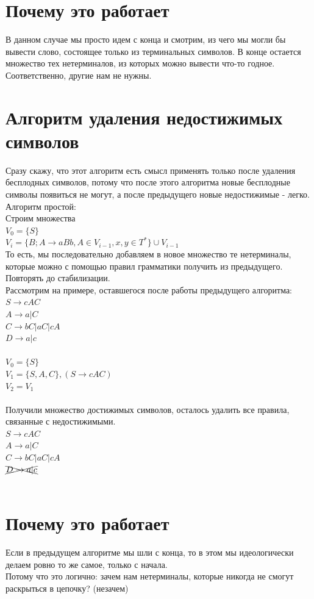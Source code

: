 \documentclass[14pt]{extreport}
\begin{document}
	\section{Почему это работает}
	В данном случае мы просто идем с конца и смотрим, из чего мы могли бы вывести слово,
	состоящее только из терминальных символов. В конце остается множество тех нетерминалов,
	из которых можно вывести что-то годное. Соответственно, другие нам не нужны.
	\section{Алгоритм удаления недостижимых символов}
	Сразу скажу, что этот алгоритм есть смысл применять только после удаления бесплодных
	символов, потому что после этого алгоритма новые бесплодные символы появиться не
	могут, а после предыдущего новые недостижимые - легко.\\
	Алгоритм простой:\\
	Строим множества\\
	$V_0=\{S\}$\\
	$V_i=\{B; A \to aBb, A \in V_{i-1}, x,y \in T^*\} \cup V_{i-1}$\\
	То есть, мы последовательно добавляем в новое множество те нетерминалы, которые
	можно с помощью правил грамматики получить из предыдущего. Повторять до стабилизации.\\
	Рассмотрим на примере, оставшегося после работы предыдущего алгоритма:\\
	$S \to cAC $\\
	$A \to a | C $\\
	$C \to bC | aC | cA $\\
	$D \to a | c$\\\\
	$V_0=\{S\}$\\
	$V_1=\{S, A, C\}, (S \to cAC)$\\
	$V_2=V_1$\\\\
	Получили множество достижимых символов, осталось удалить все правила, связанные с
	недостижимыми.\\
	$S \to cAC $\\
	$A \to a | C $\\
	$C \to bC | aC | cA $\\
	$\xcancel{D \to a | c}$\\\\
	\section{Почему это работает}
	Если в предыдущем алгоритме мы шли с конца, то в этом мы идеологически делаем
	ровно то же самое, только с начала.\\
	Потому что это логично: зачем нам нетерминалы, которые никогда не смогут
	раскрыться в цепочку? (незачем)
\end{document}
